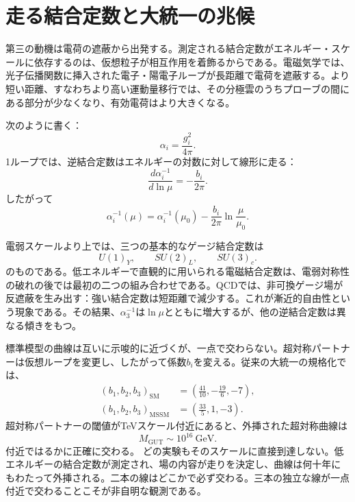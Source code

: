\section{走る結合定数と大統一の兆候}

第三の動機は電荷の遮蔽から出発する。測定される結合定数がエネルギー・スケールに依存するのは、仮想粒子が相互作用を着飾るからである。電磁気学では、光子伝播関数に挿入された電子・陽電子ループが長距離で電荷を遮蔽する。より短い距離、すなわちより高い運動量移行では、その分極雲のうちプローブの間にある部分が少なくなり、有効電荷はより大きくなる。

次のように書く：
\begin{equation}
\alpha_i=\frac{g_i^2}{4\pi}.
\end{equation}
1ループでは、逆結合定数はエネルギーの対数に対して線形に走る：
\begin{equation}
\frac{d\alpha_i^{-1}}{d\ln\mu}
=-\frac{b_i}{2\pi}.
\end{equation}
したがって
\begin{equation}
\alpha_i^{-1}(\mu)
=\alpha_i^{-1}(\mu_0)
-\frac{b_i}{2\pi}\ln\frac{\mu}{\mu_0}.
\end{equation}

電弱スケールより上では、三つの基本的なゲージ結合定数は
\begin{equation}
U(1)_Y,\qquad SU(2)_L,\qquad SU(3)_c.
\end{equation}
のものである。低エネルギーで直観的に用いられる電磁結合定数は、電弱対称性の破れの後では最初の二つの組み合わせである。QCDでは、非可換ゲージ場が反遮蔽を生み出す：強い結合定数は短距離で減少する。これが漸近的自由性という現象である。その結果、\(\alpha_3^{-1}\)は\(\ln\mu\)とともに増大するが、他の逆結合定数は異なる傾きをもつ。

標準模型の曲線は互いに示唆的に近づくが、一点で交わらない。超対称パートナーは仮想ループを変更し、したがって係数\(b_i\)を変える。従来の大統一の規格化では、
\begin{align}
(b_1,b_2,b_3)_{\mathrm{SM}}
&=\left(\frac{41}{10},-\frac{19}{6},-7\right),\\
(b_1,b_2,b_3)_{\mathrm{MSSM}}
&=\left(\frac{33}{5},1,-3\right).
\end{align}
超対称パートナーの閾値がTeVスケール付近にあると、外挿された超対称曲線は
\begin{equation}
M_{\mathrm{GUT}}\sim 10^{16}\ \mathrm{GeV}.
\end{equation}
付近ではるかに正確に交わる。
どの実験もそのスケールに直接到達しない。低エネルギーの結合定数が測定され、場の内容が走りを決定し、曲線は何十年にもわたって外挿される。二本の線はどこかで必ず交わる。三本の独立な線が一点付近で交わることこそが非自明な観測である。

